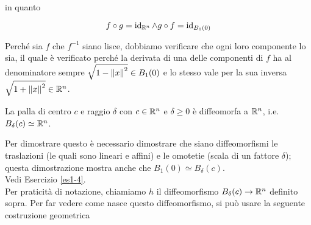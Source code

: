 in quanto

\begin{equation}
	f \circ g = \operatorname{id}_{\mathbb{R}^{n}} \wedge g \circ f = \operatorname{id}_{B_{1} (0)}
\end{equation}

Perché sia $ f $ che $ f^{-1} $ siano lisce, dobbiamo verificare che ogni loro componente lo sia, il quale è verificato perché la derivata di una delle componenti di $ f $ ha al denominatore sempre $ \sqrt{1 - \norm{x}^{2}} \in B_{1} (0) $ e lo stesso vale per la sua inversa $ \sqrt{1 + \norm{x}^{2}} \in \mathbb{R}^{n} $.

\begin{corollary}
	La palla di centro $ c $ e raggio $ \delta $ con $ c \in \mathbb{R}^{n} $ e $ \delta \geqslant 0 $ è diffeomorfa a $ \mathbb{R}^{n} $, i.e. $ B_{\delta} (c) \simeq \mathbb{R}^{n} $.
\end{corollary}

Per dimostrare questo è necessario dimostrare che siano diffeomorfismi le traslazioni (le quali sono lineari e affini) e le omotetie (scala di un fattore $ \delta $); questa dimostrazione mostra anche che $ B_{1} (0) \simeq B_{\delta} (c) $.\\
Vedi Esercizio \ref{es1-4}.\\
Per praticità di notazione, chiamiamo $ h $ il diffeomorfismo $ B_{\delta} (c) \to \mathbb{R}^{n} $ definito sopra. Per far vedere come nasce questo diffeomorfismo, si può usare la seguente costruzione geometrica

